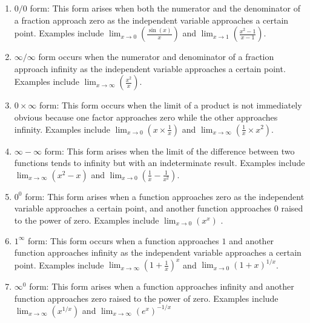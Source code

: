 \begin{enumerate}
    \item $0/0$ form: This form arises when both the numerator and the denominator of a fraction approach zero as the independent variable approaches a certain point. Examples include $\lim_{x \to 0} \left(\frac{\sin(x)}{x}\right)$ and $\lim_{x \to 1} \left(\frac{x^2 - 1}{x - 1}\right)$.
    
    \item $\infty/\infty$ form occurs when the numerator and denominator of a fraction approach infinity as the independent variable approaches a certain point. Examples include $\lim_{x \to \infty} \left(\frac{x^2}{x}\right)$.
    
    \item $0 \times \infty$ form: This form occurs when the limit of a product is not immediately obvious because one factor approaches zero while the other approaches infinity. Examples include $\lim_{x \to 0} \left(x \times \frac{1}{x}\right)$ and $\lim_{x \to \infty} \left(\frac{1}{x} \times x^2\right)$.
    
    \item $\infty - \infty$ form: This form arises when the limit of the difference between two functions tends to infinity but with an indeterminate result. Examples include $\lim_{x \to \infty} \left(x^2 - x\right)$ and $\lim_{x \to 0} \left(\frac{1}{x} - \frac{1}{x^2}\right)$.
    
    \item $0^0$ form: This form arises when a function approaches zero as the independent variable approaches a certain point, and another function approaches $0$ raised to the power of zero. Examples include $\lim_{x \to 0} \left(x^x\right)$ .
    
    \item $1^\infty$ form: This form occurs when a function approaches $1$ and another function approaches infinity as the independent variable approaches a certain point. Examples include $\lim_{x \to \infty} \left(1 + \frac{1}{x}\right)^x$ and $\lim_{x \to 0} \left(1 + x\right)^{1/x}$.
    
    \item $\infty^0$ form: This form arises when a function approaches infinity and another function approaches zero raised to the power of zero. Examples include $\lim_{x \to \infty} \left(x^{1/x}\right)$ and $\lim_{x \to \infty} \left(e^x\right)^{-1/x}$
\end{enumerate}

